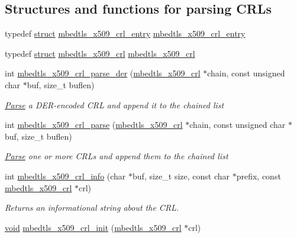 \subsection*{Structures and functions for parsing C\+R\+Ls}
\begin{DoxyCompactItemize}
\item 
typedef \hyperlink{interfacestruct}{struct} \hyperlink{structmbedtls__x509__crl__entry}{mbedtls\+\_\+x509\+\_\+crl\+\_\+entry} \hyperlink{group__x509__module_ga1e0c6230061fd501f9d00bd1b09ade33}{mbedtls\+\_\+x509\+\_\+crl\+\_\+entry}
\item 
typedef \hyperlink{interfacestruct}{struct} \hyperlink{structmbedtls__x509__crl}{mbedtls\+\_\+x509\+\_\+crl} \hyperlink{group__x509__module_ga7957605a0ced963e12880ec9e19874fc}{mbedtls\+\_\+x509\+\_\+crl}
\item 
int \hyperlink{group__x509__module_ga29ab5f1216a727b334ee26cce9f5d4b5}{mbedtls\+\_\+x509\+\_\+crl\+\_\+parse\+\_\+der} (\hyperlink{structmbedtls__x509__crl}{mbedtls\+\_\+x509\+\_\+crl} $\ast$chain, const unsigned char $\ast$buf, size\+\_\+t buflen)
\begin{DoxyCompactList}\small\item\em \hyperlink{struct_parse}{Parse} a D\+E\+R-\/encoded C\+RL and append it to the chained list \end{DoxyCompactList}\item 
int \hyperlink{group__x509__module_gadfce4fc5f5af62e371695e74c5b67d70}{mbedtls\+\_\+x509\+\_\+crl\+\_\+parse} (\hyperlink{structmbedtls__x509__crl}{mbedtls\+\_\+x509\+\_\+crl} $\ast$chain, const unsigned char $\ast$buf, size\+\_\+t buflen)
\begin{DoxyCompactList}\small\item\em \hyperlink{struct_parse}{Parse} one or more C\+R\+Ls and append them to the chained list \end{DoxyCompactList}\item 
int \hyperlink{group__x509__module_ga35898e101f5039c6db6b930da9892366}{mbedtls\+\_\+x509\+\_\+crl\+\_\+info} (char $\ast$buf, size\+\_\+t size, const char $\ast$prefix, const \hyperlink{structmbedtls__x509__crl}{mbedtls\+\_\+x509\+\_\+crl} $\ast$crl)
\begin{DoxyCompactList}\small\item\em Returns an informational string about the C\+RL. \end{DoxyCompactList}\item 
\hyperlink{interfacevoid}{void} \hyperlink{group__x509__module_ga8513a192e281217802837571da98e218}{mbedtls\+\_\+x509\+\_\+crl\+\_\+init} (\hyperlink{structmbedtls__x509__crl}{mbedtls\+\_\+x509\+\_\+crl} $\ast$crl)

\end{DoxyCompactItemize}
